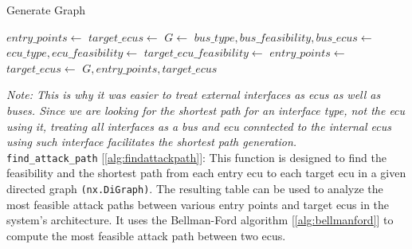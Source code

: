 \begin{algorithm}[h]
    \caption{Generate Graph}
    \label{alg:generate_graph}
    \begin{algorithmic}[1]
        \State $entry\_points \gets$ 
        \State $target\_ecus \gets$ 
        \State $G \gets$ 
            \State $bus\_type, bus\_feasibility, bus\_ecus \gets$ 
                \State $ecu\_type, ecu\_feasibility \gets$ 
                    \State {}
                \EndIf
                    \State {}
                \EndIf
                        \State {}
                    \Else
                        \State $target\_ecu\_feasibility \gets$ 
                        \State {}
                    \EndIf
                \EndFor
            \EndFor
        \EndFor
        \State $entry\_points \gets$ 
        \State $target\_ecus \gets$ 
        \State \Return $G, entry\_points, target\_ecus$
    \EndProcedure
    \end{algorithmic}
\end{algorithm}

\textit{Note: This is why it was easier to treat external interfaces as \acrshort{ecu}s as well as buses.
Since we are looking for the shortest path for an interface type, not the \acrshort{ecu} using it, treating all interfaces
as a bus and \acrshort{ecu} conntected to the internal \acrshort{ecu}s using such interface facilitates the shortest path generation.}\\


\texttt{find\_attack\_path} [\ref{alg:findattackpath}]: 
This function is designed to find the feasibility and the shortest path from each entry \acrshort{ecu} 
to each target \acrshort{ecu} in a given directed graph \texttt{(nx.DiGraph)}.
The resulting table can be used to analyze the most feasible attack paths between 
various entry points and target \acrshort{ecu}s in the system's architecture.
It uses the Bellman-Ford algorithm [\ref{alg:bellmanford}] to compute the most feasible attack path between two \acrshort{ecu}s.\\

